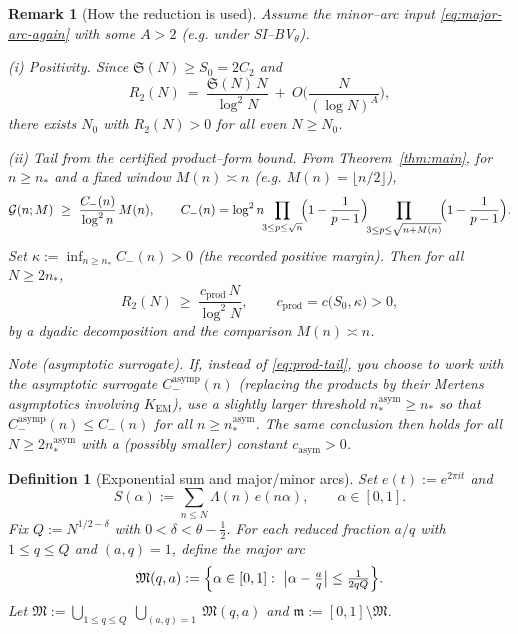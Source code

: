 \documentclass[11pt]{article}
\theoremstyle{inline}
\newtheorem*{remark}{Remark}
\theoremstyle{break}
\theoremstyle{break}
\theoremstyle{break}
\theoremstyle{break}
\theoremstyle{break}
\theoremstyle{break}
\theoremstyle{break}
\newtheorem{definition}{Definition}
\theoremstyle{inline}
\newcommand{\CminusProduct}{C_{-}}
\newcommand{\CminusAsymp}{C_{-}^{\mathrm{asymp}}}
\newcommand{\Kem}{K_{\mathrm{EM}}}              %
\newcommand{\Szero}{S_0}                        %
\newcommand{\nprodstar}{n_{\ast}}  %
\newcommand{\nasymstar}{n_{\ast}^{\mathrm{asym}}}  %
\newcommand{\kappaprod}{\kappa}    %
\begin{document}
\begin{remark}[How the reduction is used]
\label{rem:reduction-use}
Assume the minor–arc input \eqref{eq:major-arc-again} with some \(A>2\) (e.g. under SI--BV\(_\theta\)).

(i) \emph{Positivity.} Since \(\mathfrak S(N)\ge \Szero=2C_2\) and
\[
R_2(N)\ =\ \frac{\mathfrak S(N)\,N}{\log^2 N}\ +\ O\!\Big(\frac{N}{(\log N)^A}\Big),
\]
there exists \(N_0\) with \(R_2(N)>0\) for all even \(N\ge N_0\).

(ii) \emph{Tail from the certified \emph{product–form} bound.}
From Theorem~\ref{thm:main}, for \(n\ge \nprodstar\) and a fixed window \(M(n)\asymp n\) (e.g. \(M(n)=\lfloor n/2\rfloor\)),
\begin{equation}\label{eq:prod-tail}
\mathcal G(n;M)\ \ge\ \frac{\CminusProduct(n)}{\log^2 n}\,M(n),
\qquad
\CminusProduct(n)=\log^2 n\!\!\prod_{3\le p\le \sqrt n}\!\Bigl(1-\frac{1}{p-1}\Bigr)
\!\!\prod_{3\le p\le \sqrt{n+M(n)}}\!\Bigl(1-\frac{1}{p-1}\Bigr).
\end{equation}
Set \(\displaystyle \kappaprod:=\inf_{n\ge \nprodstar}\CminusProduct(n)>0\) (the recorded positive margin).
Then for all \(N\ge 2\nprodstar\),
\[
R_2(N)\ \ge\ \frac{c_{\mathrm{prod}}\,N}{\log^2 N},
\qquad
c_{\mathrm{prod}}=c\big(\Szero,\kappaprod\big)>0,
\]
by a dyadic decomposition and the comparison \(M(n)\asymp n\).

\smallskip
\emph{Note (asymptotic surrogate).}
If, instead of \eqref{eq:prod-tail}, you choose to work with the asymptotic surrogate
\(\CminusAsymp(n)\) (replacing the products by their Mertens asymptotics involving \(\Kem\)), use a slightly larger threshold \(\nasymstar\ge \nprodstar\) so that \(\CminusAsymp(n)\le \CminusProduct(n)\) for all \(n\ge\nasymstar\). The same conclusion then holds for all \(N\ge 2\nasymstar\) with a (possibly smaller) constant \(c_{\mathrm{asym}}>0\).
\end{remark}

\begin{definition}[Exponential sum and major/minor arcs]
\label{def:S-and-arcs}
Set \(e(t):=e^{2\pi i t}\) and
\begin{equation}\label{eq:S-alpha}
S(\alpha):=\sum_{n\le N}\Lambda(n)\,e(n\alpha),\qquad \alpha\in[0,1].
\end{equation}
Fix \(Q:=N^{1/2-\delta}\) with \(0<\delta<\theta-\tfrac12\). For each reduced fraction \(a/q\) with \(1\le q\le Q\) and \((a,q)=1\), define the major arc
\[
\mathfrak M(q,a):=\Bigl\{\alpha\in[0,1]:\ \bigl|\alpha-\tfrac{a}{q}\bigr| \le \tfrac{1}{2qQ}\Bigr\}.
\]
Let \(\mathfrak M:=\bigcup_{1\le q\le Q}\ \bigcup_{(a,q)=1}\ \mathfrak M(q,a)\) and \(\mathfrak m:=[0,1]\setminus \mathfrak M\).
\end{definition}
\end{document}
